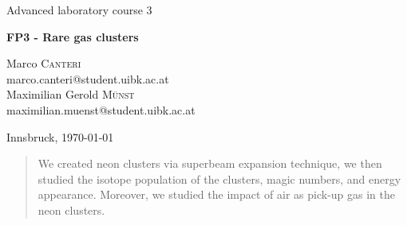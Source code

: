 \documentclass[a4paper,10pt]{article}
\begin{document}
\begin{titlepage}
 \begin{center}
	\Large{Advanced laboratory course 3}
	\end{center}
	\begin{center}
	 \LARGE{\textbf{FP3 - Rare gas clusters}}
	\end{center}

	\begin{center}

	\large Marco \textsc{Canteri} \\
	marco.canteri@student.uibk.ac.at\\
	\large Maximilian Gerold \textsc{Münst} \\
	maximilian.muenst@student.uibk.ac.at
	\end{center}

	\begin{center}
	\vspace{1cm}
	Innsbruck, \today
	\vspace{1cm}
	\end{center}

	\begin{abstract}
	We created neon clusters via superbeam expansion technique, we then studied the isotope population of the clusters, magic numbers, and energy appearance. Moreover, we studied the
	impact of air as pick-up gas in the neon clusters.
    \end{abstract}
    \vspace{1cm}


\end{titlepage}
\end{document}
